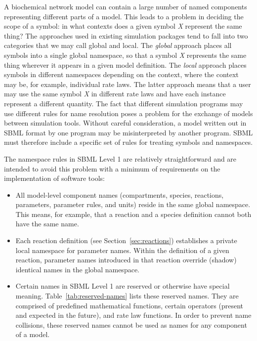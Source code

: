 \documentclass[10pt]{cekarticle}
\newcommand{\vref}[1]{\ref{#1}}
\newcommand{\changed}[1]{\textcolor{BrickRed}{#1}}
\begin{document}
A biochemical network model can contain a large number of named components
representing different parts of a model.  This leads to a problem in
deciding the scope of a symbol: in what contexts does a given symbol
\emph{X} represent the same thing?  The approaches used in existing
simulation packages tend to fall into two categories that we may call
global and local.  The \emph{global} approach places all symbols into a
single global namespace, so that a symbol \emph{X} represents the same
thing wherever it appears in a given model definition.  The \emph{local}
approach places symbols in different namespaces depending on the context,
where the context may be, for example, individual rate laws.  The latter
approach means that a user may use the same symbol \emph{X} in different
rate laws and have each instance represent a different quantity.  The fact
that different simulation programs may use different rules for name
resolution poses a problem for the exchange of models between simulation
tools.  Without careful consideration, a model written out in SBML format
by one program may be misinterpreted by another program.  SBML must
therefore include a specific set of rules for treating symbols and
namespaces.

The namespace rules in SBML Level 1 are relatively straightforward and are
intended to avoid this problem with a minimum of requirements on the
implementation of software tools:
\begin{itemize}
  
\item All model-level component names (compartments, species, reactions,
  parameters, parameter rules, and units) reside in the same global
  namespace.  This means, for example, that a reaction and a
  \changed{species} definition cannot both have the same name.
  
\item Each reaction definition (see Section~\ref{sec:reactions})
  establishes a private local namespace for parameter names.  Within the
  definition of a given reaction, parameter names introduced in that
  reaction override (shadow) identical names in the global namespace.
  
\item Certain names in SBML Level 1 are reserved or otherwise have special
  meaning.  Table~\vref{tab:reserved-names} lists these reserved names.
  They are comprised of predefined mathematical functions, certain
  operators (present and expected in the future), and rate law functions.
  In order to prevent name collisions, these reserved names cannot be used
  as names for any component of a model.

\end{itemize}  
\end{document}
